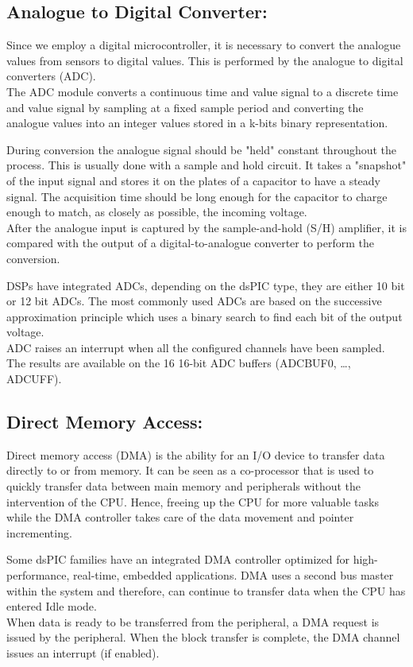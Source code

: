 \subsection{Analogue to Digital Converter:}

Since we employ a digital microcontroller, it is necessary to convert the analogue values from sensors to digital values. This is performed by the analogue to digital converters (ADC).\\
The ADC module converts a continuous time and value signal to a discrete time and value signal by sampling at a fixed sample period and converting the analogue values into an integer values stored in a k-bits binary representation.

During conversion the analogue signal should be "held" constant throughout the process. This is usually done with a sample and hold circuit. It takes a "snapshot" of the input signal and stores it on the plates of a capacitor to have a steady signal. The acquisition time should be long enough for the capacitor to charge enough to match, as closely as possible, the incoming voltage.\\
After the analogue input is captured by the sample-and-hold (S/H) amplifier, it is compared with the output of a digital-to-analogue converter to perform the conversion. 

DSPs have integrated ADCs, depending on the dsPIC type, they are either 10 bit or 12 bit ADCs.  The most commonly used ADCs are based on the successive approximation principle which uses a binary search to find each bit of the output voltage.\\
ADC raises an interrupt when all the configured channels have been sampled. The results are available on the 16 16-bit ADC buffers (ADCBUF0, …, ADCUFF).


\subsection{Direct Memory Access:}

Direct memory access (DMA) is the ability for an I/O device to transfer data directly to or from memory.  It can be seen as a co-processor that is used to quickly transfer data between main memory and peripherals without the intervention of the CPU. Hence, freeing up the CPU for more valuable tasks while the DMA controller takes care of the data movement and pointer incrementing.

Some dsPIC families have an integrated DMA controller optimized for high-performance, real-time, embedded applications. DMA uses a second bus master within the system and therefore, can continue to transfer data when the CPU has entered Idle mode.\\
When data is ready to be transferred from the peripheral, a DMA request is issued by the peripheral. When the block transfer is complete, the DMA channel issues an interrupt (if enabled).

